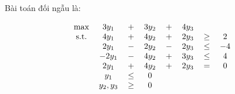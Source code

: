 \begin{solution}
    Bài toán đối ngẫu là: 


\begin{align*}
    \begin{tabular}{cccccccc}
        \text{max} & $3y_1$ & $+$ & $3y_2$ & $+$ & $4y_3$ \\
        \text{s.t.} & $4y_1$ & $+$ & $4y_2$ & $+$ & $2y_3$ & $\geq$ & $2$ \\
        & $2y_1$ & $-$ & $2y_2$ & $-$ & $2y_3$ & $\leq$ & $-4$ \\
        & $-2y_1$ & $-$ & $4y_2$ & $+$ & $3y_3$ & $\leq$ & $4$ \\
        & $2y_1$ & $+$ & $4y_2$ & $+$ & $2y_3$ & $=$ & $0$ \\
        & $y_1$ & $\leq$ & $0$ & & & & \\
        & $y_2,y_3$ & $\geq$ & $0$ & & & & \\
    \end{tabular}
\end{align*}
\end{solution}